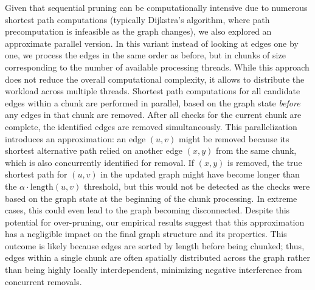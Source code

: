 Given that sequential pruning can be computationally intensive due to numerous shortest path computations (typically Dijkstra's algorithm, where path precomputation is infeasible as the graph changes), we also explored an approximate parallel version.
In this variant instead of looking at edges one by one, we process the edges in the same order as before, but in chunks of size corresponding to the number of available processing threads.
While this approach does not reduce the overall computational complexity, it allows to distribute the workload across multiple threads.
Shortest path computations for all candidate edges within a chunk are performed in parallel, based on the graph state \emph{before} any edges in that chunk are removed.
After all checks for the current chunk are complete, the identified edges are removed simultaneously.
This parallelization introduces an approximation: an edge \((u,v)\) might be removed because its shortest alternative path relied on another edge \((x,y)\) from the same chunk, which is also concurrently identified for removal.
If \((x,y)\) is removed, the true shortest path for \((u,v)\) in the updated graph might have become longer than the \(\alpha \cdot \text{length}(u,v)\) threshold, but this would not be detected as the checks were based on the graph state at the beginning of the chunk processing.
In extreme cases, this could even lead to the graph becoming disconnected.
Despite this potential for over-pruning, our empirical results suggest that this approximation has a negligible impact on the final graph structure and its properties.
This outcome is likely because edges are sorted by length before being chunked; thus, edges within a single chunk are often spatially distributed across the graph rather than being highly locally interdependent, minimizing negative interference from concurrent removals.

